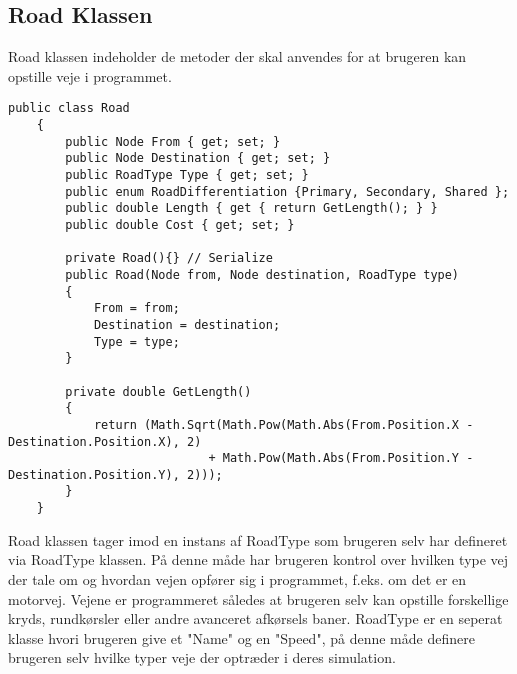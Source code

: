 \subsection{Road Klassen}
Road klassen indeholder de metoder der skal anvendes for at brugeren kan opstille veje i programmet.
\begin{lstlisting}
public class Road
    {
        public Node From { get; set; }
        public Node Destination { get; set; }
        public RoadType Type { get; set; }
        public enum RoadDifferentiation {Primary, Secondary, Shared };
        public double Length { get { return GetLength(); } }
        public double Cost { get; set; }

        private Road(){} // Serialize
        public Road(Node from, Node destination, RoadType type)
        {
            From = from;
            Destination = destination;
            Type = type;
        }

        private double GetLength()
        {
            return (Math.Sqrt(Math.Pow(Math.Abs(From.Position.X - Destination.Position.X), 2) 
                            + Math.Pow(Math.Abs(From.Position.Y - Destination.Position.Y), 2)));
        }
    }
\end{lstlisting}
Road klassen tager imod en instans af RoadType som brugeren selv har defineret via RoadType klassen. På denne måde har brugeren kontrol over hvilken type vej der tale om og hvordan vejen opfører sig i programmet, f.eks. om det er en motorvej. Vejene er programmeret således at brugeren selv kan opstille forskellige kryds, rundkørsler eller andre avanceret afkørsels baner. RoadType er en seperat klasse hvori brugeren give et "Name" og en "Speed", på denne måde definere brugeren selv hvilke typer veje der optræder i deres simulation.

